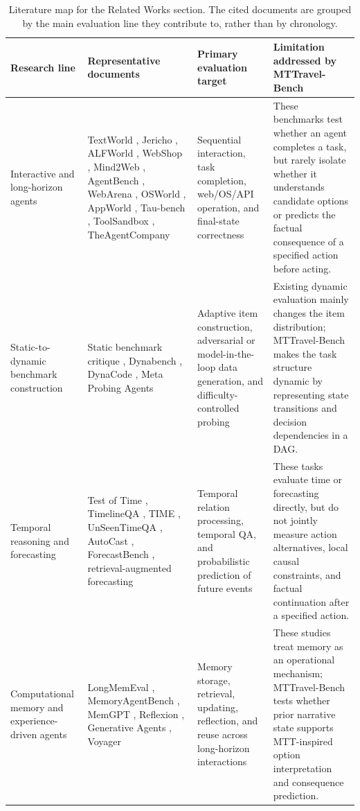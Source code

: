 \documentclass[pdflatex,sn-mathphys-num]{sn-jnl}%
\theoremstyle{thmstyleone}%
\theoremstyle{thmstyletwo}%
\theoremstyle{thmstylethree}%
\begin{document}
\begin{table}[htbp]
\centering
\scriptsize
\caption{Literature map for the Related Works section. The cited documents are grouped by the main evaluation line they contribute to, rather than by chronology.}
\label{tab:related-work-map}
\begin{tabular}{p{} p{} p{} p{}}
\toprule
Research line & Representative documents & Primary evaluation target & Limitation addressed by MTTravel-Bench \\
\midrule
Interactive and long-horizon agents & TextWorld \cite{cote2018textworld}, Jericho \cite{hausknecht2019interactive}, ALFWorld \cite{shridhar2020alfworld}, WebShop \cite{yao2022webshop}, Mind2Web \cite{deng2023mind2web}, AgentBench \cite{liu2023agentbench}, WebArena \cite{zhou2023webarena}, OSWorld \cite{xie2024osworld}, AppWorld \cite{trivedi2024appworld}, Tau-bench \cite{yao2024bench}, ToolSandbox \cite{lu2024toolsandbox}, TheAgentCompany \cite{xu2024theagentcompany} & Sequential interaction, task completion, web/OS/API operation, and final-state correctness & These benchmarks test whether an agent completes a task, but rarely isolate whether it understands candidate options or predicts the factual consequence of a specified action before acting. \\
Static-to-dynamic benchmark construction & Static benchmark critique \cite{bowman2021take}, Dynabench \cite{kiela2021dynabench}, DynaCode \cite{hu2025dynacode}, Meta Probing Agents \cite{zhu2024dynamic} & Adaptive item construction, adversarial or model-in-the-loop data generation, and difficulty-controlled probing & Existing dynamic evaluation mainly changes the item distribution; MTTravel-Bench makes the task structure dynamic by representing state transitions and decision dependencies in a DAG. \\
Temporal reasoning and forecasting & Test of Time \cite{fatemi2024test}, TimelineQA \cite{tan2023timelineqa}, TIME \cite{wei2025time}, UnSeenTimeQA \cite{uddin2024unseentimeqa}, AutoCast \cite{zou2022forecasting}, ForecastBench \cite{karger2024forecastbench}, retrieval-augmented forecasting \cite{halawi2024approaching} & Temporal relation processing, temporal QA, and probabilistic prediction of future events & These tasks evaluate time or forecasting directly, but do not jointly measure action alternatives, local causal constraints, and factual continuation after a specified action. \\
Computational memory and experience-driven agents & LongMemEval \cite{wu2024longmemeval}, MemoryAgentBench \cite{hu2025evaluating}, MemGPT \cite{packer2023memgpt}, Reflexion \cite{shinn2023reflexion}, Generative Agents \cite{park2023generative}, Voyager \cite{wang2023voyager} & Memory storage, retrieval, updating, reflection, and reuse across long-horizon interactions & These studies treat memory as an operational mechanism; MTTravel-Bench tests whether prior narrative state supports MTT-inspired option interpretation and consequence prediction. \\

\end{tabular}
\end{table}
\end{document}
